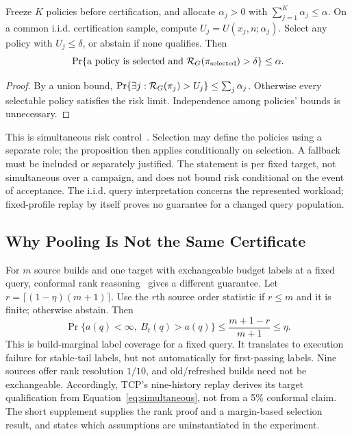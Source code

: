 \begin{proposition}
\label{prop:simultaneous}
Freeze $K$ policies before certification, and allocate $\alpha_j>0$ with $\sum_{j=1}^K\alpha_j\le\alpha$. On a common i.i.d. certification sample, compute $U_j=U(x_j,n;\alpha_j)$. Select any policy with $U_j\le\delta$, or abstain if none qualifies. Then
\begin{equation}
 \Pr\{\text{a policy is selected and }\mathcal{R}_G(\pi_{\rm selected})>\delta\}\le\alpha.\label{eq:simultaneous}
\end{equation}
\end{proposition}
\begin{proof}
By a union bound, $\Pr\{\exists j:\mathcal{R}_G(\pi_j)>U_j\}\le\sum_j\alpha_j$. Otherwise every selectable policy satisfies the risk limit. Independence among policies' bounds is unnecessary.
\end{proof}
This is simultaneous risk control~\cite{angelopoulos2021ltt}. Selection may define the policies using a separate role; the proposition then applies conditionally on selection. A fallback must be included or separately justified. The statement is per fixed target, not simultaneous over a campaign, and does not bound risk conditional on the event of acceptance. The i.i.d. query interpretation concerns the represented workload; fixed-profile replay by itself proves no guarantee for a changed query population.

\subsection{Why Pooling Is Not the Same Certificate}
\label{sec:pooling-theory}
For $m$ source builds and one target with exchangeable budget labels at a fixed query, conformal rank reasoning~\cite{angelopoulos2023conformal} gives a different guarantee. Let $r=\lceil(1-\eta)(m+1)\rceil$. Use the $r$th source order statistic if $r\le m$ and it is finite; otherwise abstain. Then
\begin{equation}
 \Pr\{a(q)<\infty,\ B_t(q)>a(q)\}\le\frac{m+1-r}{m+1}\le\eta.\label{eq:pooling}
\end{equation}
This is build-marginal label coverage for a fixed query. It translates to execution failure for stable-tail labels, but not automatically for first-passing labels. Nine sources offer rank resolution $1/10$, and old/refreshed builds need not be exchangeable. Accordingly, TCP's nine-history replay derives its target qualification from Equation~\eqref{eq:simultaneous}, not from a 5\% conformal claim. The short supplement supplies the rank proof and a margin-based selection result, and states which assumptions are uninstantiated in the experiment.
